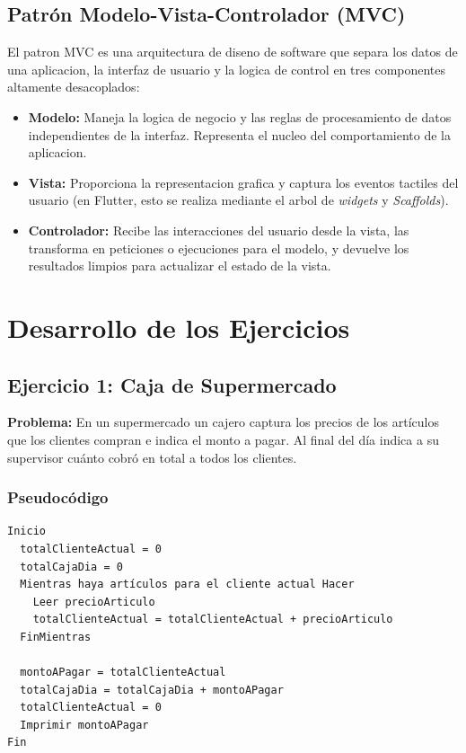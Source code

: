 \documentclass[12pt, a4paper]{article}
\begin{document}
\subsection{Patrón Modelo-Vista-Controlador (MVC)}
El patron MVC es una arquitectura de diseno de software que separa los datos de una aplicacion, la interfaz de usuario y la logica de control en tres componentes altamente desacoplados:
\begin{itemize}
  \item \textbf{Modelo:} Maneja la logica de negocio y las reglas de procesamiento de datos independientes de la interfaz. Representa el nucleo del comportamiento de la aplicacion.
  \item \textbf{Vista:} Proporciona la representacion grafica y captura los eventos tactiles del usuario (en Flutter, esto se realiza mediante el arbol de \textit{widgets} y \textit{Scaffolds}).
  \item \textbf{Controlador:} Recibe las interacciones del usuario desde la vista, las transforma en peticiones o ejecuciones para el modelo, y devuelve los resultados limpios para actualizar el estado de la vista.
\end{itemize}

\newpage
\section{Desarrollo de los Ejercicios}

\subsection{Ejercicio 1: Caja de Supermercado}
\textbf{Problema:} En un supermercado un cajero captura los precios de los artículos que los clientes compran e indica el monto a pagar. Al final del día indica a su supervisor cuánto cobró en total a todos los clientes.

\subsubsection{Pseudocódigo}
\begin{verbatim}
Inicio
  totalClienteActual = 0
  totalCajaDia = 0
  Mientras haya artículos para el cliente actual Hacer
    Leer precioArticulo
    totalClienteActual = totalClienteActual + precioArticulo
  FinMientras
  
  montoAPagar = totalClienteActual
  totalCajaDia = totalCajaDia + montoAPagar
  totalClienteActual = 0
  Imprimir montoAPagar
Fin
\end{verbatim}
\end{document}
